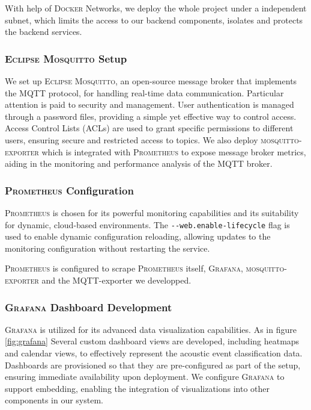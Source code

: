With help of \textsc{Docker} Networks, we deploy the whole project under a independent subnet, which limits the access to our backend components, isolates and protects the backend services.

\subsubsection{\textsc{Eclipse Mosquitto} Setup}
We set up \textsc{Eclipse Mosquitto}, an open-source message broker that implements the MQTT protocol, for handling real-time data communication. Particular attention is paid to security and management. User authentication is managed through a password files, providing a simple yet effective way to control access. Access Control Lists (ACLs) are used to grant specific permissions to different users, ensuring secure and restricted access to topics. We also deploy \textsc{mosquitto-exporter}\cite{mosquittoexporter} which is integrated with \textsc{Prometheus} to expose message broker metrics, aiding in the monitoring and performance analysis of the MQTT broker.

\subsubsection{\textsc{Prometheus} Configuration}
\textsc{Prometheus} is chosen for its powerful monitoring capabilities and its suitability for dynamic, cloud-based environments. The \texttt{\lstinline{--web.enable-lifecycle}} flag is used to enable dynamic configuration reloading, allowing updates to the monitoring configuration without restarting the service.

\textsc{Prometheus} is configured to scrape \textsc{Prometheus} itself, \textsc{Grafana}, \textsc{mosquitto-exporter} and the MQTT-exporter we developped.

\subsubsection{\textsc{Grafana} Dashboard Development}
\textsc{Grafana} is utilized for its advanced data visualization capabilities. As in figure \ref{fig:grafana} Several custom dashboard views are developed, including heatmaps and calendar views, to effectively represent the acoustic event classification data. Dashboards are provisioned so that they are pre-configured as part of the setup, ensuring immediate availability upon deployment. We configure \textsc{Grafana} to support embedding, enabling the integration of visualizations into other components in our system.

